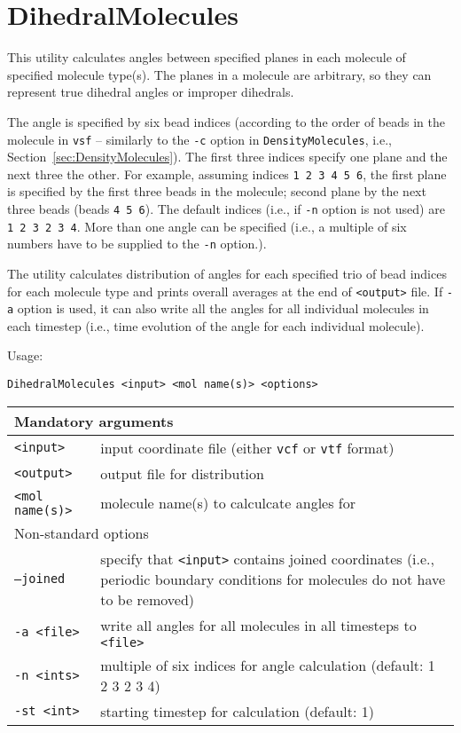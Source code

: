 \section{DihedralMolecules} \label{sec:DihedralMolecules}

This utility calculates angles between specified planes in each molecule of
specified molecule type(s). The planes in a molecule are arbitrary, so they
can represent true dihedral angles or improper dihedrals.

The angle is specified by six bead indices (according to the order of beads
in the molecule in \texttt{vsf} -- similarly to the \texttt{-c} option in
\texttt{DensityMolecules}, i.e., Section~\ref{sec:DensityMolecules}). The
first three indices specify one plane and the next three the other. For
example, assuming indices \texttt{1 2 3 4 5 6}, the first plane is
specified by the first three beads in the molecule; second plane by the
next three beads (beads \texttt{4 5 6}). The default indices
(i.e., if \texttt{-n} option is not used) are \texttt{1 2 3 2 3 4}. More
than one angle can be specified (i.e., a multiple of six numbers have to be
supplied to the \texttt{-n} option.).

The utility calculates distribution of angles for each specified trio of
bead indices for each molecule type and prints overall averages at the end
of \texttt{<output>} file. If \texttt{-a} option is used, it can also write
all the angles for all individual molecules in each timestep (i.e., time
evolution of the angle for each individual molecule).

Usage:

\vspace{1em}
\noindent
\texttt{DihedralMolecules <input> <mol name(s)> <options>}

\noindent
\begin{longtable}{p{}p{}}
  \toprule
  \multicolumn{2}{l}{Mandatory arguments} \\
  \midrule
  \texttt{<input>} & input coordinate file (either \texttt{vcf} or
    \texttt{vtf} format) \\
  \texttt{<output>} & output file for distribution \\
  \texttt{<mol name(s)>} & molecule name(s) to calculcate angles for \\
  \toprule
  \multicolumn{2}{l}{Non-standard options} \\
  \midrule
  \texttt{--joined} & specify that \texttt{<input>} contains joined
    coordinates (i.e., periodic boundary conditions for molecules do not
    have to be removed) \\
  \texttt{-a <file>} & write all angles for all molecules in all timesteps
    to \texttt{<file>} \\
  \texttt{-n  <ints>} & multiple of six indices for angle calculation
    (default: 1 2 3 2 3 4) \\
  \texttt{-st <int>} & starting timestep for calculation (default: 1) \\
  \bottomrule
\end{longtable}

